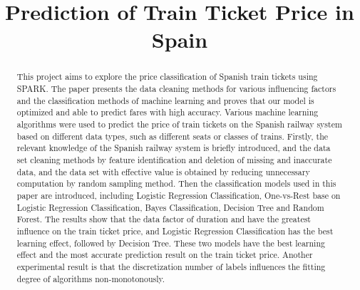 \documentclass[conference]{IEEEtran}
\begin{document}
\title{Prediction of Train Ticket Price in Spain\\}
\author{
\and
{}
\and
{}
\and
{}
}
\maketitle


\begin{abstract}
This project aims to explore the price classification of Spanish train tickets using SPARK. The paper presents the data cleaning methods for various influencing factors and the classification methods of machine learning and proves that our model is optimized and able to predict fares with high accuracy. Various machine learning algorithms were used to predict the price of train tickets on the Spanish railway system based on different data types, such as different seats or classes of trains. Firstly, the relevant knowledge of the Spanish railway system is briefly introduced, and the data set cleaning methods by feature identification and deletion of missing and inaccurate data, and the data set with effective value is obtained by reducing unnecessary computation by random sampling method. Then the classification models used in this paper are introduced, including Logistic Regression Classification, One-vs-Rest base on Logistic Regression Classification, Bayes Classification, Decision Tree and Random Forest. The results show that the data factor of duration and  have the greatest influence on the train ticket price, and Logistic Regression Classification has the best learning effect, followed by Decision Tree. These two models have the best learning effect and the most accurate prediction result on the train ticket price. Another experimental result is that the discretization number of labels influences the fitting degree of algorithms non-monotonously.
\end{abstract}
\end{document}
